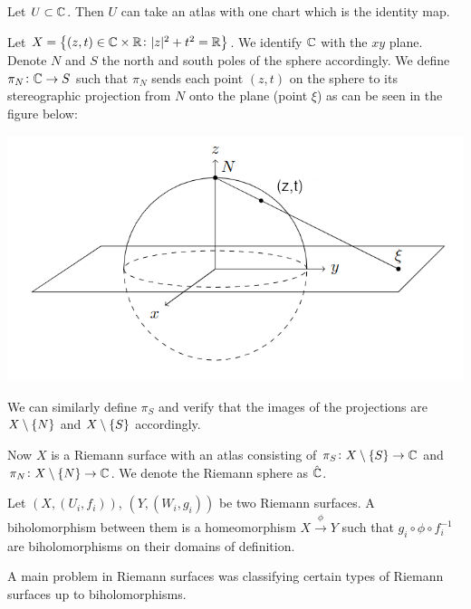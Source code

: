 \documentclass[11pt,a4paper]{article}
\begin{document}
\begin{example}
    Let $U \subset \mathbb{C}$.
    Then $U$ can take an atlas with one chart which is the identity map.
\end{example}

\begin{example}
    Let $X = \set{(z,t) \in \mathbb{C}\times \mathbb{R}\colon |z|^2 + t^2 = \mathbb{R}}$.
    We identify $\mathbb{C}$ with the $xy$ plane.
    Denote $N$ and $S$ the north and south poles of the sphere accordingly.
    We define $\pi_N \colon \mathbb{C} \to S$ such that $\pi_N$ sends each point
    $(z,t)$ on the sphere to its stereographic projection 
    from $N$ onto the plane (point $\xi$) as can be seen in the figure
    below:
    \begin{center}
      \includegraphics[scale=0.5]{RiemannSphere.png}
    \end{center}
    We can similarly define $\pi_S$ and verify that the images of the
    projections are $X \setminus \set{N}$ and $X \setminus \set{S}$
    accordingly.
    
    Now $X$ is a Riemann surface with an atlas consisting of 
    $\pi_S \colon X \setminus \set{S} \to \mathbb{C}$ and
    $\pi_N \colon X \setminus \set{N} \to \mathbb{C}$.
    We denote the Riemann sphere as $\hat{\mathbb{C}}$.
\end{example}

\begin{definition}
    Let $(X, (U_i, f_i))$, $(Y, (W_i,g_i))$ be two Riemann surfaces.
    A biholomorphism between them is a homeomorphism
    $X \xrightarrow{\phi} Y$ such that $g_i \circ \phi \circ f_i^{-1}$ 
    are biholomorphisms on their domains of definition.
\end{definition}

A main problem in Riemann surfaces was classifying certain types of 
Riemann surfaces up to biholomorphisms.
\end{document}
